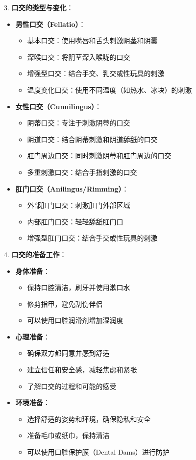\documentclass[12pt,UTF8]{ctexbook}
\begin{document}
3. \textbf{口交的类型与变化}：
\begin{itemize}
	\item \textbf{男性口交（Fellatio）}：
	\begin{itemize}
		\item 基本口交：使用嘴唇和舌头刺激阴茎和阴囊
		\item 深喉口交：将阴茎深入喉咙的口交
		\item 增强型口交：结合手交、乳交或性玩具的刺激
		\item 温度变化口交：使用不同温度（如热水、冰块）的刺激
	\end{itemize}
	\item \textbf{女性口交（Cunnilingus）}：
	\begin{itemize}
		\item 阴蒂口交：专注于刺激阴蒂的口交
		\item 阴道口交：结合阴蒂刺激和阴道舔舐的口交
		\item 肛门周边口交：同时刺激阴蒂和肛门周边的口交
		\item 多重刺激口交：结合手指刺激的口交
	\end{itemize}
	\item \textbf{肛门口交（Anilingus/Rimming）}：
	\begin{itemize}
		\item 外部肛门口交：刺激肛门外部区域
		\item 内部肛门口交：轻轻舔舐肛门口
		\item 增强型肛门口交：结合手交或性玩具的刺激
	\end{itemize}
\end{itemize}

4. \textbf{口交的准备工作}：
\begin{itemize}
	\item \textbf{身体准备}：
	\begin{itemize}
		\item 保持口腔清洁，刷牙并使用漱口水
		\item 修剪指甲，避免刮伤伴侣
		\item 可以使用口腔润滑剂增加湿润度
	\end{itemize}
	\item \textbf{心理准备}：
	\begin{itemize}
		\item 确保双方都同意并感到舒适
		\item 建立信任和安全感，减轻焦虑和紧张
		\item 了解口交的过程和可能的感受
	\end{itemize}
	\item \textbf{环境准备}：
	\begin{itemize}
		\item 选择舒适的姿势和环境，确保隐私和安全
		\item 准备毛巾或纸巾，保持清洁
		\item 可以使用口腔保护膜（Dental Dams）进行防护
	\end{itemize}
\end{itemize}
\end{document}
